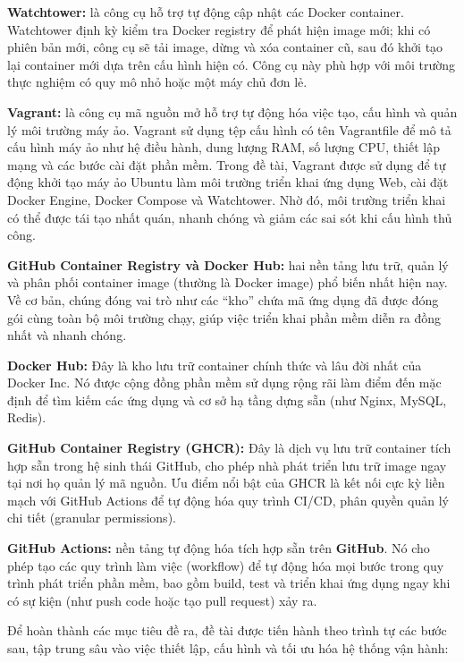 \documentclass[12pt,a4paper,oneside]{extreport}
\begin{document}
\textbf{Watchtower:} là công cụ hỗ trợ tự động cập nhật các Docker container.
Watchtower định kỳ kiểm tra Docker registry để phát hiện image mới; khi có
phiên bản mới, công cụ sẽ tải image, dừng và xóa container cũ, sau đó khởi tạo
lại container mới dựa trên cấu hình hiện có. Công cụ này phù hợp với môi trường
thực nghiệm có quy mô nhỏ hoặc một máy chủ đơn lẻ.

\textbf{Vagrant:} là công cụ mã nguồn mở hỗ trợ tự động hóa việc tạo, cấu hình
và quản lý môi trường máy ảo. Vagrant sử dụng tệp cấu hình có tên Vagrantfile
để mô tả cấu hình máy ảo như hệ điều hành, dung lượng RAM, số lượng CPU, thiết
lập mạng và các bước cài đặt phần mềm. Trong đề tài, Vagrant được sử dụng để tự
động khởi tạo máy ảo Ubuntu làm môi trường triển khai ứng dụng Web, cài đặt
Docker Engine, Docker Compose và Watchtower. Nhờ đó, môi trường triển khai có
thể được tái tạo nhất quán, nhanh chóng và giảm các sai sót khi cấu hình thủ
công.

\textbf{GitHub Container Registry và Docker Hub:} hai nền tảng lưu trữ, quản lý
và phân phối container image (thường là Docker image) phổ biến nhất hiện nay.
Về cơ bản, chúng đóng vai trò như các ``kho'' chứa mã ứng dụng đã được đóng gói
cùng toàn bộ môi trường chạy, giúp việc triển khai phần mềm diễn ra đồng nhất
và nhanh chóng.

\textbf{Docker Hub:} Đây là kho lưu trữ container chính thức và lâu đời nhất
của Docker Inc. Nó được cộng đồng phần mềm sử dụng rộng rãi làm điểm đến mặc
định để tìm kiếm các ứng dụng và cơ sở hạ tầng dựng sẵn (như Nginx, MySQL,
Redis).

\textbf{GitHub Container Registry (GHCR):} Đây là dịch vụ lưu trữ container
tích hợp sẵn trong hệ sinh thái GitHub, cho phép nhà phát triển lưu trữ image
ngay tại nơi họ quản lý mã nguồn. Ưu điểm nổi bật của GHCR là kết nối cực kỳ
liền mạch với GitHub Actions để tự động hóa quy trình CI/CD, phân quyền quản lý
chi tiết (granular permissions).

\textbf{GitHub Actions:} nền tảng tự động hóa tích hợp sẵn trên \textbf{GitHub}.
Nó cho phép tạo các quy trình làm việc (workflow) để tự động hóa mọi bước trong
quy trình phát triển phần mềm, bao gồm build, test và triển khai ứng dụng ngay
khi có sự kiện (như push code hoặc tạo pull request) xảy ra.

Để hoàn thành các mục tiêu đề ra, đề tài được tiến hành theo trình tự các bước
sau, tập trung sâu vào việc thiết lập, cấu hình và tối ưu hóa hệ thống vận
hành:
\end{document}
